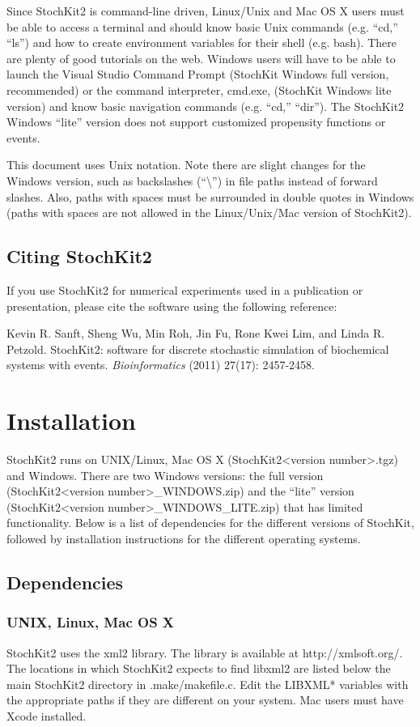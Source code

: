 \documentclass[11pt,letterpaper]{article}
\begin{document}
Since StochKit2 is command-line driven, Linux/Unix and Mac OS X users must be able to access a terminal and should know basic Unix commands (e.g. ``cd,'' ``ls'') and how to create environment variables for their shell (e.g. bash).  There are plenty of good tutorials on the web.  Windows users will have to be able to launch the Visual Studio Command Prompt (StochKit Windows full version, recommended) or the command interpreter, cmd.exe, (StochKit Windows lite version) and know basic navigation commands (e.g. ``cd,'' ``dir'').
The StochKit2 Windows “lite” version does not support customized propensity functions or events.

This document uses Unix notation.  Note there are slight changes for the Windows version, such as backslashes (``\textbackslash'') in file paths instead of forward slashes.   Also, paths with spaces must be surrounded in double quotes in Windows (paths with spaces are not allowed in the Linux/Unix/Mac version of StochKit2).

\subsection{Citing StochKit2}
If you use StochKit2 for numerical experiments used in a publication or presentation, please cite the software using the following reference:

Kevin R. Sanft, Sheng Wu, Min Roh, Jin Fu, Rone Kwei Lim, and Linda R. Petzold. StochKit2: software for discrete stochastic simulation of biochemical systems with events. \textit{Bioinformatics} (2011) 27(17): 2457-2458.


\section{Installation}
StochKit2 runs on UNIX/Linux, Mac OS X (StochKit2<version number>.tgz) and Windows.  There are two Windows versions: the full version (StochKit2<version number>\_WINDOWS.zip) and the “lite” version (StochKit2<version number>\_WINDOWS\_LITE.zip) that has limited functionality.  Below is a list of dependencies for the different versions of StochKit, followed by installation instructions for the different operating systems.

\subsection{Dependencies}
\subsubsection*{UNIX, Linux, Mac OS X}
StochKit2 uses the xml2 library.  The library is available at http://xmlsoft.org/.  The locations in which StochKit2 expects to find libxml2 are listed below the main StochKit2 directory in .make/makefile.c.  Edit the LIBXML* variables with the appropriate paths if they are different on your system. Mac users must have Xcode installed.
\end{document}
